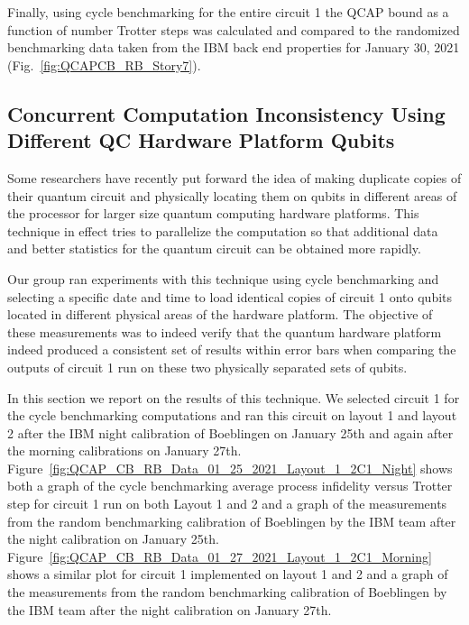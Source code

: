 Finally, using cycle benchmarking for the entire circuit 1 the QCAP bound as a function of number Trotter steps was calculated and compared to the randomized benchmarking data taken from the IBM back end properties for January 30, 2021 (Fig.~\ref{fig:QCAPCB_RB_Story7}).



\subsection{Concurrent Computation Inconsistency Using Different QC Hardware Platform Qubits}
\label{sec:concurrent-computation-inconsistency-analysis}


Some researchers have recently put forward the idea of making duplicate copies of their quantum circuit and physically locating them on qubits in different areas of the processor for larger size quantum computing hardware platforms.  This technique in effect tries to parallelize the computation so that additional data and better statistics for the quantum circuit can be obtained more rapidly.

Our group ran experiments with this technique using cycle benchmarking and selecting a specific date and time to load identical copies of circuit 1 onto qubits located in different physical areas of the hardware platform.  The objective of these measurements was to indeed verify that the quantum hardware platform indeed produced a consistent set of results within error bars when comparing the outputs of circuit 1 run on these two physically separated sets of qubits.

In this section we report on the results of this technique.  We selected circuit 1 for the cycle benchmarking computations and ran this circuit on layout 1 and layout 2 after the IBM night calibration of Boeblingen on January 25th and again after the morning calibrations on January 27th. Figure~\ref{fig:QCAP_CB_RB_Data_01_25_2021_Layout_1_2C1_Night} shows both a graph of the cycle benchmarking average process infidelity versus Trotter step for circuit 1 run on both Layout 1 and 2 and a graph of the measurements from the random benchmarking calibration of Boeblingen by the IBM team after the night calibration on January 25th.  Figure~\ref{fig:QCAP_CB_RB_Data_01_27_2021_Layout_1_2C1_Morning} shows a similar plot for circuit 1 implemented on layout 1 and 2 and a graph of the measurements from the random benchmarking calibration of Boeblingen by the IBM team after the night calibration on January 27th.

